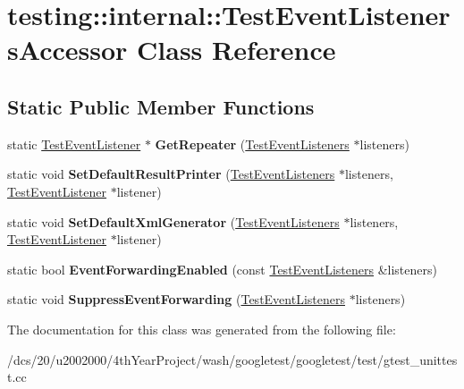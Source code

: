 \hypertarget{classtesting_1_1internal_1_1TestEventListenersAccessor}{}\section{testing\+:\+:internal\+:\+:Test\+Event\+Listeners\+Accessor Class Reference}
\label{classtesting_1_1internal_1_1TestEventListenersAccessor}
\subsection*{Static Public Member Functions}
\begin{DoxyCompactItemize}
\item 
\mbox{\label{classtesting_1_1internal_1_1TestEventListenersAccessor_a07c6f8644e509d0f23c0c16a60856387}} 
static \mbox{\hyperlink{classtesting_1_1TestEventListener}{Test\+Event\+Listener}} $\ast$ {\bfseries Get\+Repeater} (\mbox{\hyperlink{classtesting_1_1TestEventListeners}{Test\+Event\+Listeners}} $\ast$listeners)
\item 
\mbox{\label{classtesting_1_1internal_1_1TestEventListenersAccessor_ac8886c7cea5a4ad39aed276d3f58da75}} 
static void {\bfseries Set\+Default\+Result\+Printer} (\mbox{\hyperlink{classtesting_1_1TestEventListeners}{Test\+Event\+Listeners}} $\ast$listeners, \mbox{\hyperlink{classtesting_1_1TestEventListener}{Test\+Event\+Listener}} $\ast$listener)
\item 
\mbox{\label{classtesting_1_1internal_1_1TestEventListenersAccessor_a8c04463b5ba5ee6d6da36e2171c7fff0}} 
static void {\bfseries Set\+Default\+Xml\+Generator} (\mbox{\hyperlink{classtesting_1_1TestEventListeners}{Test\+Event\+Listeners}} $\ast$listeners, \mbox{\hyperlink{classtesting_1_1TestEventListener}{Test\+Event\+Listener}} $\ast$listener)
\item 
\mbox{\label{classtesting_1_1internal_1_1TestEventListenersAccessor_a4a7522557045cb55eb037dc61429d71c}} 
static bool {\bfseries Event\+Forwarding\+Enabled} (const \mbox{\hyperlink{classtesting_1_1TestEventListeners}{Test\+Event\+Listeners}} \&listeners)
\item 
\mbox{\label{classtesting_1_1internal_1_1TestEventListenersAccessor_abfc0a0f8163465f4f5d42436ec8c7cb3}} 
static void {\bfseries Suppress\+Event\+Forwarding} (\mbox{\hyperlink{classtesting_1_1TestEventListeners}{Test\+Event\+Listeners}} $\ast$listeners)
\end{DoxyCompactItemize}


The documentation for this class was generated from the following file\+:\begin{DoxyCompactItemize}
\item 
/dcs/20/u2002000/4th\+Year\+Project/wash/googletest/googletest/test/gtest\+\_\+unittest.\+cc\end{DoxyCompactItemize}

